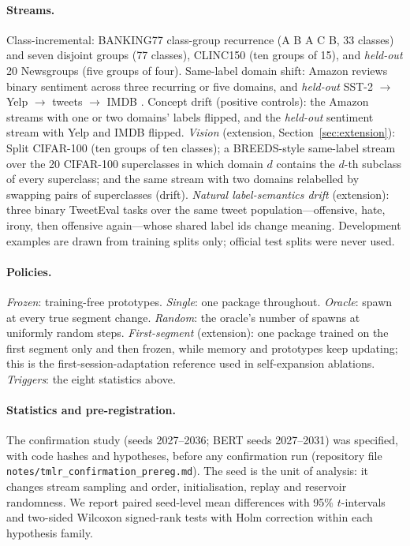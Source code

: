 \documentclass[10pt]{article}
\begin{document}
\paragraph{Streams.} Class-incremental: BANKING77 \citep{casanueva2020banking} class-group recurrence (A B A C B, 33 classes) and seven disjoint groups (77 classes), CLINC150 \citep{larson2019clinc} (ten groups of 15), and \emph{held-out} 20 Newsgroups \citep{lang1995newsweeder} (five groups of four). Same-label domain shift: Amazon reviews \citep{keung2020marc} binary sentiment across three recurring or five domains, and \emph{held-out} SST-2 $\to$ Yelp $\to$ tweets $\to$ IMDB \citep{socher2013sst,zhang2015charcnn,barbieri2020tweeteval,maas2011imdb}. Concept drift (positive controls): the Amazon streams with one or two domains' labels flipped, and the \emph{held-out} sentiment stream with Yelp and IMDB flipped. \emph{Vision} (extension, Section~\ref{sec:extension}): Split CIFAR-100 \citep{krizhevsky2009cifar} (ten groups of ten classes); a BREEDS-style \citep{santurkar2021breeds} same-label stream over the 20 CIFAR-100 superclasses in which domain $d$ contains the $d$-th subclass of every superclass; and the same stream with two domains relabelled by swapping pairs of superclasses (drift). \emph{Natural label-semantics drift} (extension): three binary TweetEval tasks over the same tweet population---offensive, hate, irony, then offensive again---whose shared label ids change meaning. Development examples are drawn from training splits only; official test splits were never used.

\paragraph{Policies.} \emph{Frozen}: training-free prototypes. \emph{Single}: one package throughout. \emph{Oracle}: spawn at every true segment change. \emph{Random}: the oracle's number of spawns at uniformly random steps. \emph{First-segment} (extension): one package trained on the first segment only and then frozen, while memory and prototypes keep updating; this is the first-session-adaptation reference used in self-expansion ablations. \emph{Triggers}: the eight statistics above.

\paragraph{Statistics and pre-registration.} The confirmation study (seeds 2027--2036; BERT seeds 2027--2031) was specified, with code hashes and hypotheses, before any confirmation run (repository file \texttt{notes/tmlr\_confirmation\_prereg.md}). The seed is the unit of analysis: it changes stream sampling and order, initialisation, replay and reservoir randomness. We report paired seed-level mean differences with 95\% $t$-intervals and two-sided Wilcoxon signed-rank tests with Holm correction within each hypothesis family.
\end{document}

